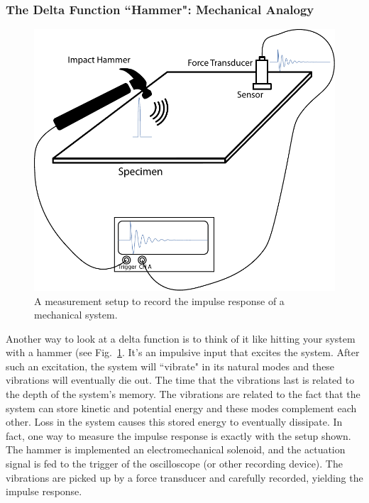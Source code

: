 \subsubsection{The Delta Function ``Hammer":  Mechanical Analogy}
\begin{figure}[tb]
\centering
\includegraphics[width=.5\columnwidth]{hammer_resonance}
\caption{A measurement setup to record the impulse response of a mechanical system. }
\label{fig:hammer_setup}
\end{figure}
Another way to look at a delta function is to think of it like hitting your system with a hammer (see Fig.~\ref{fig:hammer_setup}.  It's an impulsive input that excites the system.  After such an excitation, the system will ``vibrate" in its natural modes and these vibrations will eventually die out.  The time that the vibrations last is related to the depth of the system's memory.  The vibrations are related to the fact that the system can store kinetic and potential energy and these modes complement each other.  Loss in the system causes this stored energy to eventually dissipate.  In fact, one way to measure the impulse response is exactly with the setup shown.  The hammer is implemented an electromechanical solenoid, and the actuation signal is fed to the trigger of the oscilloscope (or other recording device).  The vibrations are picked up by a force transducer and carefully recorded, yielding the impulse response.     
